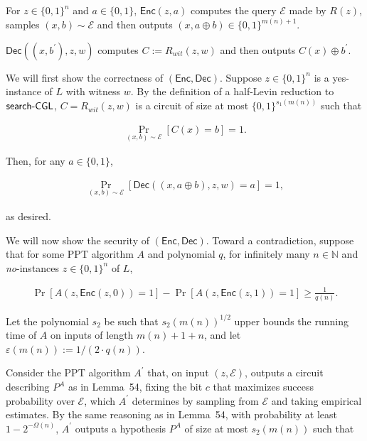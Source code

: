 \documentclass[10pt,a4paper]{article}
\begin{document}
For $z\in\{0,1\}^{n}$ and $a\in\{0,1\}$, ${\mathsf{Enc}}(z,a)$ computes the query $\mathcal{E}$ made by $R(z)$, samples $(x,b)\sim\mathcal{E}$ and then outputs $(x,a\oplus b)\in\{0,1\}^{m(n)+1}$.\par




${\mathsf{Dec}}((x,b^{\prime}),z,w)$ computes $C:=R_{wit}(z,w)$ and then outputs $C(x)\oplus b^{\prime}$.\par



We will first show the correctness of $({\mathsf{Enc}},{\mathsf{Dec}})$. Suppose $z\in\{0,1\}^{n}$ is a yes-instance of $L$ with witness $w$. By the definition of a half-Levin reduction to ${\sf search}\text{-}{\sf CGL}$, $C=R_{wit}(z,w)$ is a circuit of size at most $\{0,1\}^{s_{1}(m(n))}$ such that\par


\[\begin{gathered}
\Pr_{(x,b)\sim\mathcal{E}}[C(x)=b]=1.
\end{gathered}\]


Then, for any $a\in\{0,1\}$,\par


\[\begin{gathered}
\Pr_{(x,b)\sim\mathcal{E}}[{\mathsf{Dec}}((x,a\oplus b),z,w)=a]=1,
\end{gathered}\]


as desired.\par




We will now show the security of $({\mathsf{Enc}},{\mathsf{Dec}})$. Toward a contradiction, suppose that for some PPT algorithm $A$ and polynomial $q$, for infinitely many $n\in\mathbb{N}$ and \emph{no}-instances $z\in\{0,1\}^{n}$ of $L$,\par


\[\begin{gathered}
\Pr[A(z,{\mathsf{Enc}}(z,0))=1]-\Pr[A(z,{\mathsf{Enc}}(z,1))=1]\geq\frac{1}{q(n)}.
\end{gathered}\]


Let the polynomial $s_{2}$ be such that $s_{2}(m(n))^{1/2}$ upper bounds the running time of $A$ on inputs of length $m(n)+1+n$, and let $\varepsilon(m(n)):=1/(2\cdot q(n))$.\par




Consider the PPT algorithm $A^{\prime}$ that, on input $(z,\mathcal{E})$, outputs a circuit describing $P^{A}$ as in Lemma 54, fixing the bit $c$ that maximizes success probability over $\mathcal{E}$, which $A^{\prime}$ determines by sampling from $\mathcal{E}$ and taking empirical estimates.
By the same reasoning as in Lemma 54, with probability at least $1-2^{-\Omega(n)}$, $A^{\prime}$ outputs a hypothesis $P^{A}$ of size at most $s_{2}(m(n))$ such that\par
\end{document}
